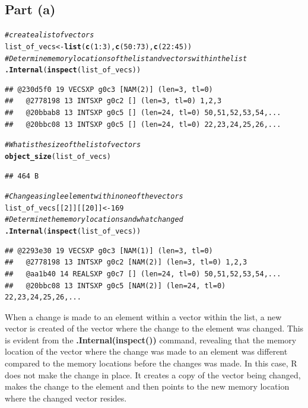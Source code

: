 \documentclass{article}\usepackage[]{graphicx}\usepackage[]{color}
\makeatletter
\newcommand{\hlnum}[1]{\textcolor[rgb]{0.686,0.059,0.569}{#1}}%
\newcommand{\hlcom}[1]{\textcolor[rgb]{0.678,0.584,0.686}{\textit{#1}}}%
\newcommand{\hlopt}[1]{\textcolor[rgb]{0,0,0}{#1}}%
\newcommand{\hlstd}[1]{\textcolor[rgb]{0.345,0.345,0.345}{#1}}%
\newcommand{\hlkwb}[1]{\textcolor[rgb]{0.69,0.353,0.396}{#1}}%
\newcommand{\hlkwd}[1]{\textcolor[rgb]{0.737,0.353,0.396}{\textbf{#1}}}%
\newenvironment{kframe}{%
 \def\at@end@of@kframe{}%
 \ifinner\ifhmode%
  \def\at@end@of@kframe{\end{minipage}}%
  \begin{minipage}{\columnwidth}%
 \fi\fi%
 \def\FrameCommand##1{\hskip\@totalleftmargin \hskip-\fboxsep
 \colorbox{shadecolor}{##1}\hskip-\fboxsep
     \hskip-\linewidth \hskip-\@totalleftmargin \hskip\columnwidth}%
 \MakeFramed {\advance\hsize-\width
   \@totalleftmargin\z@ \linewidth\hsize
   \@setminipage}}%
 {\par\unskip\endMakeFramed%
 \at@end@of@kframe}
\newenvironment{knitrout}{}{} %
\makeatother
\begin{document}
\subsection{Part (a)}
\begin{knitrout}
\color{fgcolor}\begin{kframe}
\begin{alltt}
\hlcom{#create a list of vectors}
\hlstd{list_of_vecs} \hlkwb{<-} \hlkwd{list}\hlstd{(}\hlkwd{c}\hlstd{(}\hlnum{1}\hlopt{:}\hlnum{3}\hlstd{),} \hlkwd{c}\hlstd{(}\hlnum{50}\hlopt{:}\hlnum{73}\hlstd{),} \hlkwd{c}\hlstd{(}\hlnum{22}\hlopt{:}\hlnum{45}\hlstd{))}
\hlcom{#Determine memory locations of the list and vectors within the list}
\hlkwd{.Internal}\hlstd{(}\hlkwd{inspect}\hlstd{(list_of_vecs))}
\end{alltt}
\begin{verbatim}
## @230d5f0 19 VECSXP g0c3 [NAM(2)] (len=3, tl=0)
##   @2778198 13 INTSXP g0c2 [] (len=3, tl=0) 1,2,3
##   @20bbab8 13 INTSXP g0c5 [] (len=24, tl=0) 50,51,52,53,54,...
##   @20bbc08 13 INTSXP g0c5 [] (len=24, tl=0) 22,23,24,25,26,...
\end{verbatim}
\begin{alltt}
\hlcom{#What is the size of the list of vectors}
\hlkwd{object_size}\hlstd{(list_of_vecs)}
\end{alltt}
\begin{verbatim}
## 464 B
\end{verbatim}
\begin{alltt}
\hlcom{#Change a single element within one of the vectors}
\hlstd{list_of_vecs[[}\hlnum{2}\hlstd{]][[}\hlnum{20}\hlstd{]]} \hlkwb{<-} \hlnum{169}
\hlcom{#Determine the memory locations and what changed}
\hlkwd{.Internal}\hlstd{(}\hlkwd{inspect}\hlstd{(list_of_vecs))}
\end{alltt}
\begin{verbatim}
## @2293e30 19 VECSXP g0c3 [NAM(1)] (len=3, tl=0)
##   @2778198 13 INTSXP g0c2 [NAM(2)] (len=3, tl=0) 1,2,3
##   @aa1b40 14 REALSXP g0c7 [] (len=24, tl=0) 50,51,52,53,54,...
##   @20bbc08 13 INTSXP g0c5 [NAM(2)] (len=24, tl=0) 22,23,24,25,26,...
\end{verbatim}
\end{kframe}
\end{knitrout}
When a change is made to an element within a vector within the list, a new vector is created of the vector where the change to the element was changed.  This is evident from the \textbf{.Internal(inspect())} command, revealing that the memory location of the vector where the change was made to an element was different compared to the memory locations before the changes was made.  In this case, R does not make the change in place.  It creates a copy of the vector being changed, makes the change to the element and then points to the new memory location where the changed vector resides.
\end{document}
